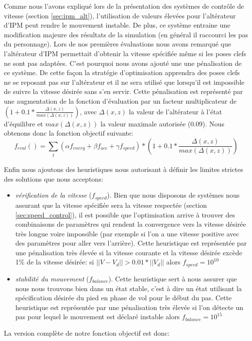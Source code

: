 \documentclass[runningheads,a4paper]{llncs}
\begin{document}
Comme nous l'avons expliqué lors de la présentation des systèmes de contrôle de vitesse (section \ref{sec:ipm_alt}), l'utilisation de valeurs élevées pour l'altérateur d'IPM peut rendre le mouvement instable. De plus, ce système entraine une modification majeure des résultats de la simulation (en général il raccourci les pas du personnage). Lors de nos premières évaluations nous avons remarqué que l'altérateur d'IPM permettait d'obtenir la vitesse spécifiée même si les poses clefs ne sont pas adaptées. C'est pourquoi nous avons ajouté une une pénalisation de ce système. De cette façon la stratégie d'optimisation apprendra des poses clefs ne se reposant pas sur l'altérateur et il ne sera utilisé que lorsqu'il est impossible de suivre la vitesse désirée sans s'en servir. Cette pénalisation est représenté par une augmentation de la fonction d'évaluation par un facteur multiplicateur de $(1+0.1*\frac{\Delta(x,z)}{max(\Delta(x,z))})$, avec $\Delta(x,z)$ la valeur de l'altérateur à l'état d'équilibre et $max(\Delta(x,z))$ la valeur maximale autorisée (0.09). Nous obtenons donc la fonction objectif suivante:
$$
f_{eval}() = \sum_{\substack{t}} (\alpha f_{energ} + \beta f_{acc} + \gamma f_{speed})*(1+0.1*\frac{\Delta(x,z)}{max(\Delta(x,z))}) 
$$

Enfin nous ajoutons des heuristiques nous autorisant à définir les limites strictes des solutions que nous acceptons:
\begin{itemize}
\item{\textit{vérification de la vitesse} ($f_{speed}$). Bien que nous disposons de systèmes nous assurant que la vitesse spécifiée sera la vitesse respectée (section \ref{sec:speed_control}), il est possible que l'optimisation arrive à trouver des combinaisons de paramètres qui rendent la convergence vers la vitesse désirée très longue voire impossible (par exemple si l'on a une vitesse positive avec des paramètres pour aller vers l'arrière). Cette heuristique est représentée par une pénalisation très élevée si la vitesse courante et la vitesse désirée excède 1\% de la vitesse désirée: si $||V-V_d||>0.01*||V_d||$ alors $f_{speed}=10^{10}$}
\item{\textit{stabilité du mouvement} ($f_{balance}$).  Cette heuristique sert à nous assurer que nous nous trouvons bien dans un état stable, c'est à dire un état utilisant la spécification désirée du pied en phase de vol pour le début du pas. Cette heuristique est représentée par une pénalisation très élevée si l'on détecte un pas pour lequel le mouvement est déclaré instable alors $f_{balance}=10^{15}$  }
\end{itemize}
 La version complète de notre fonction objectif est donc:
\end{document}
